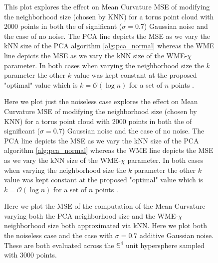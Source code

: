 \documentclass{article}
\begin{document}
\begin{figure}
    \centering
    \qquad
    \caption{This plot explores the effect on Mean Curvature MSE of modifying the neighborhood size (chosen by KNN) for a torus point cloud with 2000 points in both the of significant ($\sigma = 0.7$) Gaussian noise and the case of no noise. The PCA line depicts the MSE as we vary the kNN size of the PCA algorithm \eqref{alg:pca_normal} whereas the WME line depicts the MSE as we vary the kNN size of the WME-$\chi$ parameter. In both cases when varying the neighborhood size the $k$ parameter the other $k$ value was kept constant at the proposed "optimal" value which is $k = \mathcal{O}(\log n)$ for a set of $n$ points \cite{Cao_2021}. }%
    \label{fig:KNN_neighborhood_varying_MSE_curvature}
\end{figure}


\begin{figure}
    \centering
    \qquad
    \caption{Here we plot just the noiseless case explores the effect on Mean Curvature MSE of modifying the neighborhood size (chosen by KNN) for a torus point cloud with 2000 points in both the of significant ($\sigma = 0.7$) Gaussian noise and the case of no noise. The PCA line depicts the MSE as we vary the kNN size of the PCA algorithm \eqref{alg:pca_normal} whereas the WME line depicts the MSE as we vary the kNN size of the WME-$\chi$ parameter. In both cases when varying the neighborhood size the $k$ parameter the other $k$ value was kept constant at the proposed "optimal" value which is $k = \mathcal{O}(\log n)$ for a set of $n$ points \cite{Cao_2021}. }%
    \label{fig:eps_neighborhood_varying_MSE_curvature}
\end{figure}

\begin{figure}

  \centering
    \qquad
    \caption{Here we plot the MSE of the computation of the Mean Curvature varying both the PCA neighborhood size and the WME-$\chi$ neighborhood size both approximated via kNN. Here we plot both the noiseless case and the case with $\sigma = 0.7$ additive Gaussian noise. These are both evaluated across the $\mathbb{S}^4$ unit hypersphere sampled with 3000 points. }%
\label{fig:hypersphere}
\end{figure}
\end{document}
